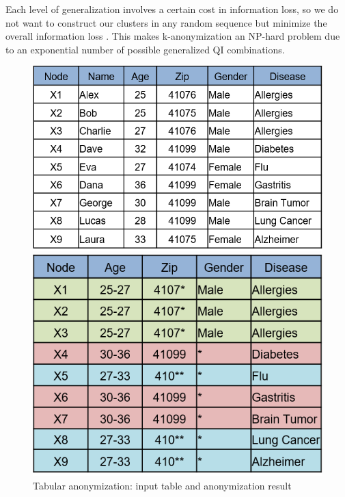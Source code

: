 \documentclass{llncs}
\begin{document}
Each level of generalization involves a certain cost in information loss, so we do not want to construct our clusters in any random sequence but minimize the overall information loss \cite{aggarwal2005approximation}. This makes k-anonymization an NP-hard problem due to an exponential number of possible generalized QI combinations.

\begin{figure}[!t]
	\centering
	\begin{minipage}[b]{0.5\textwidth}
		\includegraphics[width=\textwidth]{figures/anonym/k_anon_input}
	\end{minipage}
	\hfill
	\begin{minipage}[b]{0.418\textwidth}
		\includegraphics[width=\textwidth]{figures/anonym/k_anon_output}
	\end{minipage}
	\caption{Tabular anonymization: input table and anonymization result}
	\label{fig:anonymized_clusters}
\end{figure}
\end{document}
